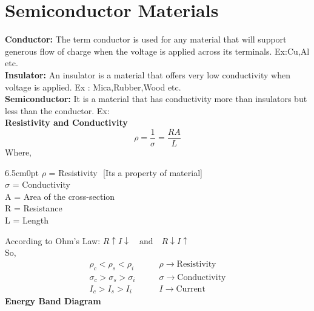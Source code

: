 \documentclass[a4aper,12pt]{report}
\begin{document}
\section{Semiconductor Materials}
\textbf{Conductor: }The term conductor is used for any material that will support generous flow of charge when the voltage is applied across its terminals. Ex:Cu,Al etc. \\ [3pt]
\textbf{Insulator: }An insulator is a material that offers very low conductivity when voltage is applied. Ex : Mica,Rubber,Wood etc. \\ [3pt]
\textbf{Semiconductor: }It is a material that has conductivity more than insulators but less than the conductor. Ex:  \\ [10pt]
\textbf{\large Resistivity and Conductivity}
$$\rho = \dfrac{1}{\sigma} = \dfrac{RA}{L}$$
\hspace*{5cm}Where, 
\begin{adjustwidth}{6.5cm}{0pt}
    $\rho$ = Resistivity\,\,\,\,[Its a property of material] \\
    $\sigma$ = Conductivity \\
    A = Area of the cross-section\\
    R = Resistance \\ 
    L = Length 
\end{adjustwidth}
\vspace*{10pt}
According to Ohm's Law: $R\uparrow I\downarrow \quad \text{and} \quad R\downarrow I\uparrow$ \\ [3pt]
\hspace*{4cm}So, 
\vspace*{-10pt}
\begin{align*}
    \rho_c < \rho_s < \rho _i \qquad &\rho \longrightarrow \text{Resistivity} \\
    \sigma_c > \sigma_s > \sigma _i  \qquad &\sigma \longrightarrow \text{Conductivity} \\
    I_c > I_s > I_i \qquad &I \longrightarrow \text{Current }
\end{align*}
\textbf{\large Energy Band Diagram}
\end{document}
